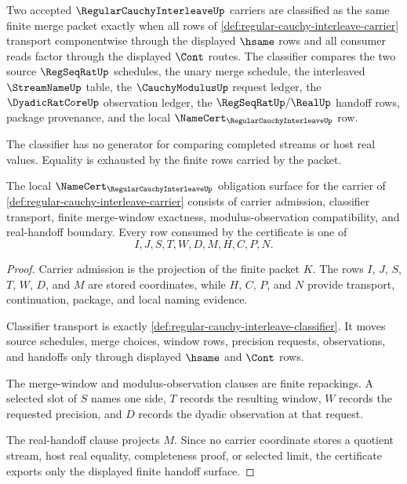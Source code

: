 \begin{definition}
\label{def:regular-cauchy-interleave-classifier}
Two accepted $\RegularCauchyInterleaveUp$ carriers are classified as the same finite merge packet exactly when all rows of \autoref{def:regular-cauchy-interleave-carrier} transport componentwise through the displayed $\hsame$ rows and all consumer reads factor through the displayed $\Cont$ routes. The classifier compares the two source $\RegSeqRatUp$ schedules, the unary merge schedule, the interleaved $\StreamNameUp$ table, the $\CauchyModulusUp$ request ledger, the $\DyadicRatCoreUp$ observation ledger, the $\RegSeqRatUp/\RealUp$ handoff rows, package provenance, and the local $\NameCert_{\RegularCauchyInterleaveUp}$ row.

The classifier has no generator for comparing completed streams or host real values. Equality is exhausted by the finite rows carried by the packet.
\end{definition}

\begin{theorem}
\label{thm:regular-cauchy-interleave-namecert-obligations}
The local $\NameCert_{\RegularCauchyInterleaveUp}$ obligation surface for the carrier of \autoref{def:regular-cauchy-interleave-carrier} consists of carrier admission, classifier transport, finite merge-window exactness, modulus-observation compatibility, and real-handoff boundary. Every row consumed by the certificate is one of
$$
I,J,S,T,W,D,M,H,C,P,N.
$$
\end{theorem}
\begin{proof}
Carrier admission is the projection of the finite packet $K$. The rows $I$, $J$, $S$, $T$, $W$, $D$, and $M$ are stored coordinates, while $H$, $C$, $P$, and $N$ provide transport, continuation, package, and local naming evidence.

Classifier transport is exactly \autoref{def:regular-cauchy-interleave-classifier}. It moves source schedules, merge choices, window rows, precision requests, observations, and handoffs only through displayed $\hsame$ and $\Cont$ rows.

The merge-window and modulus-observation clauses are finite repackings. A selected slot of $S$ names one side, $T$ records the resulting window, $W$ records the requested precision, and $D$ records the dyadic observation at that request.

The real-handoff clause projects $M$. Since no carrier coordinate stores a quotient stream, host real equality, completeness proof, or selected limit, the certificate exports only the displayed finite handoff surface.
\end{proof}

